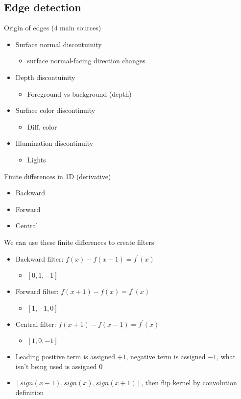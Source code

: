\subsection{Edge detection}
Origin of edges (4 main sources)
\begin{itemize}
    \item Surface normal discontuinity
    \begin{itemize}
        \item surface normal-facing direction changes
    \end{itemize}
    \item Depth discontuinity
    \begin{itemize}
        \item Foreground vs background (depth)
    \end{itemize}
    \item Surface color discontinuity
    \begin{itemize}
        \item Diff. color
    \end{itemize}
    \item Illumination discontinuity
    \begin{itemize}
        \item Lights
    \end{itemize}
\end{itemize}
Finite differences in 1D (derivative)
\begin{itemize}
    \item Backward
    \item Forward
    \item Central
\end{itemize}
We can use these finite differences to create filters
\begin{itemize}
    \item Backward filter: $f(x)-f(x-1)=f^\prime(x)$
    \begin{itemize}
        \item $[0,1,-1]$
    \end{itemize}
    \item Forward filter: $f(x+1)-f(x)=f^\prime(x)$
    \begin{itemize}
        \item $[1,-1,0]$
    \end{itemize}
    \item Central filter: $f(x+1)-f(x-1) = f^\prime(x)$
    \begin{itemize}
        \item $[1,0,-1]$
    \end{itemize}
    \item Leading positive term is assigned $+1$, negative term is assigned $-1$, what isn't being used is assigned $0$
    \item $[sign(x-1), sign(x), sign(x+1)]$, then flip kernel by convolution definition
\end{itemize}
